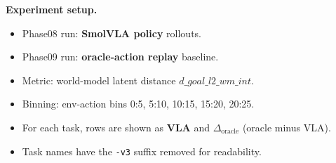\documentclass{article}
\begin{document}
\noindent\textbf{Experiment setup.}
\begin{itemize}
\setlength{\itemsep}{0.25em}
\setlength{\parsep}{0pt}
\setlength{\topsep}{0.25em}
\setlength{\partopsep}{0pt}
\item Phase08 run: \textbf{SmolVLA policy} rollouts.
\item Phase09 run: \textbf{oracle-action replay} baseline.
\item Metric: world-model latent distance $d\_goal\_l2\_wm\_int$.
\item Binning: env-action bins 0:5, 5:10, 10:15, 15:20, 20:25.
\item For each task, rows are shown as \textbf{VLA} and \textbf{$\Delta_{\mathrm{oracle}}$} (oracle minus VLA).
\item Task names have the \texttt{-v3} suffix removed for readability.
\end{itemize}
\end{document}
